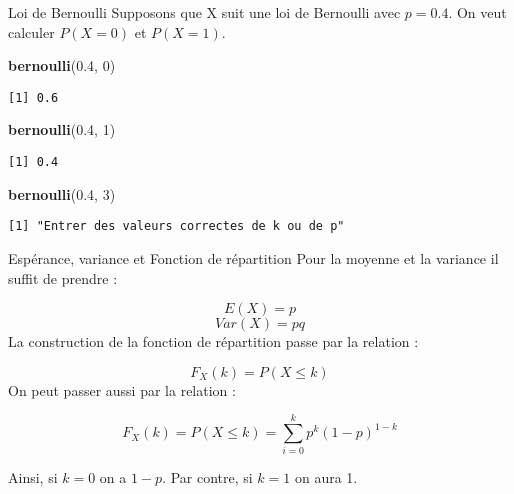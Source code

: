 \documentclass[
  ignorenonframetext,
]{beamer}
\newenvironment{Shaded}{\begin{snugshade}}{\end{snugshade}}
\newcommand{\DecValTok}[1]{\textcolor[rgb]{0.00,0.00,0.81}{#1}}
\newcommand{\FloatTok}[1]{\textcolor[rgb]{0.00,0.00,0.81}{#1}}
\newcommand{\FunctionTok}[1]{\textcolor[rgb]{0.13,0.29,0.53}{\textbf{#1}}}
\newcommand{\NormalTok}[1]{#1}
\begin{document}
\begin{frame}[fragile]{Loi de Bernoulli}
\protect\hypertarget{loi-de-bernouilli-1}{}
Supposons que X suit une loi de Bernoulli
avec \(p=0.4\). On veut calculer \(P(X=0)\) et \(P(X=1)\).

\begin{Shaded}
\begin{Highlighting}[]
\FunctionTok{bernoulli}\NormalTok{(}\FloatTok{0.4}\NormalTok{, }\DecValTok{0}\NormalTok{)}
\end{Highlighting}
\end{Shaded}

\begin{verbatim}
[1] 0.6
\end{verbatim}

\begin{Shaded}
\begin{Highlighting}[]
\FunctionTok{bernoulli}\NormalTok{(}\FloatTok{0.4}\NormalTok{, }\DecValTok{1}\NormalTok{)}
\end{Highlighting}
\end{Shaded}

\begin{verbatim}
[1] 0.4
\end{verbatim}

\begin{Shaded}
\begin{Highlighting}[]
\FunctionTok{bernoulli}\NormalTok{(}\FloatTok{0.4}\NormalTok{, }\DecValTok{3}\NormalTok{)}
\end{Highlighting}
\end{Shaded}

\begin{verbatim}
[1] "Entrer des valeurs correctes de k ou de p"
\end{verbatim}
\end{frame}

\begin{frame}{Espérance, variance et Fonction de répartition}
\protect\hypertarget{espuxe9rance-variance-et-fonction-de-ruxe9partition}{}
Pour la moyenne et la variance il suffit de prendre :

\[E(X) = p\] \[Var(X) = pq\] La construction de la fonction de
répartition passe par la relation :

\[F_X (k) = P(X\le k)\] On peut passer aussi par la relation :

\[F_X (k) = P(X\le k) = \sum_{i=0}^k p^k (1-p)^{1-k}\]

Ainsi, si \(k=0\) on a \(1-p\). Par contre, si \(k=1\) on aura 1.
\end{frame}
\end{document}
